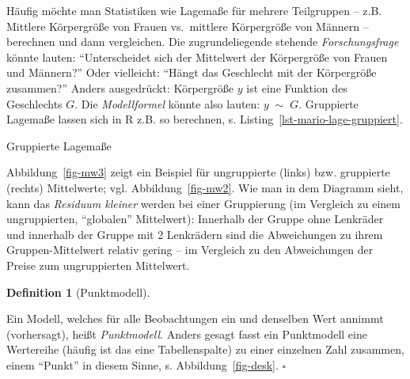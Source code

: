 \documentclass[
  letterpaper,
  twoside,
  open=any]{scrbook}
\newenvironment{Shaded}{\begin{snugshade}}{\end{snugshade}}
\newcommand{\AttributeTok}[1]{\textcolor[rgb]{0.40,0.45,0.13}{#1}}
\newcommand{\CommentTok}[1]{\textcolor[rgb]{0.37,0.37,0.37}{#1}}
\newcommand{\FunctionTok}[1]{\textcolor[rgb]{0.28,0.35,0.67}{#1}}
\newcommand{\NormalTok}[1]{\textcolor[rgb]{0.00,0.23,0.31}{#1}}
\newcommand{\OtherTok}[1]{\textcolor[rgb]{0.00,0.23,0.31}{#1}}
\newcommand{\SpecialCharTok}[1]{\textcolor[rgb]{0.37,0.37,0.37}{#1}}
\theoremstyle{definition}
\theoremstyle{definition}
\theoremstyle{definition}
\newtheorem{definition}{Definition}[chapter]
\theoremstyle{remark}
\begin{document}
Häufig möchte man Statistiken wie Lagemaße für mehrere Teilgruppen --
z.B. Mittlere Körpergröße von Frauen vs.~mittlere Körpergröße von
Männern -- berechnen und dann vergleichen. Die zugrundeliegende stehende
\emph{Forschungsfrage} könnte lauten: \enquote{Unterscheidet sich der
Mittelwert der Körpergröße von Frauen und Männern?} Oder vielleicht:
\enquote{Hängt das Geschlecht mit der Körpergröße zusammen?} Anders
ausgedrückt: Körpergröße \(y\) ist eine Funktion des Geschlechts \(G\).
Die \emph{Modellformel} könnte also lauten: \({y} \;{ \sim } \; {G}\).
Gruppierte Lagemaße lassen sich in R z.B. so berechnen, s.
Listing~\ref{lst-mario-lage-gruppiert}.

\begin{codelisting}

\caption{\label{lst-mario-lage-gruppiert}Gruppierte Lagemaße}

\centering{

\begin{Shaded}
\begin{Highlighting}[]
\NormalTok{mariokart\_lagemaße\_gruppiert }\OtherTok{\textless{}{-}}
\NormalTok{  mariokart }\SpecialCharTok{\%\textgreater{}\%} 
  \FunctionTok{group\_by}\NormalTok{(wheels) }\SpecialCharTok{\%\textgreater{}\%}  \CommentTok{\# neue Zeile, der Rest ist gleich!}
  \FunctionTok{summarise}\NormalTok{(}\AttributeTok{mw =} \FunctionTok{mean}\NormalTok{(total\_pr))}
\end{Highlighting}
\end{Shaded}

}

\end{codelisting}%

Abbildung~\ref{fig-mw3} zeigt ein Beispiel für ungruppierte (links) bzw.
gruppierte (rechts) Mittelwerte; vgl. Abbildung~\ref{fig-mw2}. Wie man
in dem Diagramm sieht, kann das \emph{Residuum kleiner} werden bei einer
Gruppierung (im Vergleich zu einem ungruppierten, \enquote{globalen}
Mittelwert): Innerhalb der Gruppe ohne Lenkräder und innerhalb der
Gruppe mit 2 Lenkrädern sind die Abweichungen zu ihrem
Gruppen-Mittelwert relativ gering -- im Vergleich zu den Abweichungen
der Preise zum ungruppierten Mittelwert.

\begin{definition}[Punktmodell]\protect\hypertarget{def-punktmodell}{}\label{def-punktmodell}

Ein Modell, welches für alle Beobachtungen ein und denselben Wert
annimmt (vorhersagt), heißt \emph{Punktmodell}. Anders gesagt fasst ein
Punktmodell eine Wertereihe (häufig ist das eine Tabellenspalte) zu
einer einzelnen Zahl zusammen, einem \enquote{Punkt} in diesem Sinne, s.
Abbildung~\ref{fig-desk}. \(\square\)

\end{definition}
\end{document}
